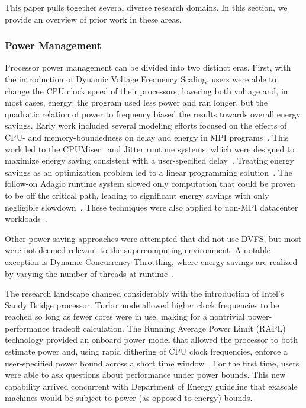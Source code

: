 This paper pulls together several diverse research domains. In this section,
we provide an overview of prior work in these areas.

\subsubsection{Power Management}
Processor power management can be divided into two distinct eras. First, with 
the introduction of Dynamic Voltage Frequency Scaling, users were able to 
change the CPU clock speed of their processors, lowering both voltage and,
in most cases, energy: the program used less power and ran longer, but the
quadratic relation of power to frequency biased the results towards overall
energy savings. Early work included several modeling efforts focused on
the effects of CPU- and memory-boundedness on delay and energy in MPI programs~\cite{SpringerPPoPP2006,GeICPP2007,LiHPCA2006,CameronSC2005,HsuSC2005}. 
This work led to the CPUMiser~\cite{GeICPP2007} and Jitter runtime systems, which were designed 
to maximize energy saving consistent with a user-specified delay~\cite{KappiahSC2005}.
Treating energy savings as an optimization problem led to a linear programming
solution~\cite{rountree:07}. The follow-on Adagio runtime system slowed only
computation that could be proven to be off the critical path, leading to significant
energy savings with only negligible slowdown~\cite{rountree:09}. These 
techniques were also applied to non-MPI datacenter workloads~\cite{femal:04}. 

Other power saving approaches were attempted that did not use DVFS, but most
were not deemed relevant to the supercomputing environment. A notable exception
is Dynamic Concurrency Throttling, where energy savings are realized by varying
the number of threads at runtime~\cite{Curtis1,Curtis2,Curtis3,porterfield2013power}.

The research landscape changed considerably with the introduction of Intel's
Sandy Bridge processor. Turbo mode allowed higher clock frequencies to be
reached so long as fewer cores were in use, making for a nontrivial power- performance tradeoff
calculation. The Running Average Power Limit (RAPL) technology provided an onboard power model that allowed the processor to both
estimate power and, using rapid dithering of CPU clock frequencies, enforce a
user-specified power bound across a short time window~\cite{IntelSDM,David2010}. 
For the first time, users were able to ask questions about performance under 
power bounds. This new capability arrived concurrent with Department of Energy
guideline that exascale machines would be subject to power (as opposed to energy) bounds.

